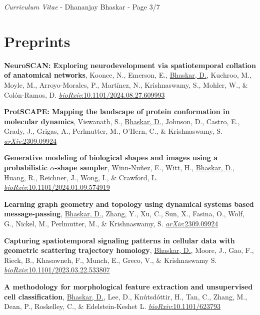 \documentclass[margin,line]{res}
\begin{document}
\begin{resume}
\newpage
\begin{flushright}
\textit{Curriculum Vitae} - Dhananjay Bhaskar - Page 3/7
\end{flushright}
\vspace*{.02cm}


\section{\sc Preprints}
{
\renewcommand\leftmargini{0em}
\renewcommand{\labelenumi}{P\theenumi}
\begin{etaremune}[start=6]
\item{\bf NeuroSCAN: Exploring neurodevelopment via spatiotemporal collation of anatomical networks},
Koonce, N., Emerson, E., \underline{Bhaskar, D.}, Kuchroo, M., Moyle, M., Arroyo-Morales, P., Martínez, N., Krishnaswamy, S., Mohler, W., \& Colón-Ramos, D.
\href{https://doi.org/10.1101/2024.08.27.609993}{\textit{bioRxiv}:10.1101/2024.08.27.609993}
\item{\bf ProtSCAPE: Mapping the landscape of protein conformation in molecular dynamics},
Viswanath, S., \underline{Bhaskar, D.}, Johnson, D., Castro, E., Grady, J., Grigas, A., Perlmutter, M., O'Hern, C., \& Krishnaswamy, S.
\href{https://arxiv.org/abs/2309.09924}{\textit{arXiv}:2309.09924}
\vspace*{.1cm}
\item{\bf Generative modeling of biological shapes and images using a probabilistic $\alpha$-shape sampler},
Winn-Nu\~{n}ez, E., Witt, H., \underline{Bhaskar, D.}, Huang, R., Reichner, J., Wong, I., \& Crawford, L.
\href{https://doi.org/10.1101/2024.01.09.574919}{\textit{bioRxiv}:10.1101/2024.01.09.574919}
\vspace*{.1cm}
\item{\bf Learning graph geometry and topology using dynamical systems based message-passing},
\underline{Bhaskar, D.}, Zhang, Y., Xu, C., Sun, X., Fasina, O., Wolf, G., Nickel, M., Perlmutter, M., \& Krishnaswamy, S. 
\href{https://arxiv.org/abs/2309.09924}{\textit{arXiv}:2309.09924}
\vspace*{.1cm}
\item{\bf Capturing spatiotemporal signaling patterns in cellular data with geometric scattering trajectory homology},
\underline{Bhaskar, D.}, Moore, J., Gao, F., Rieck, B., Khasawneh, F., Munch, E., Greco, V., \& Krishnaswamy S.
\href{https://doi.org/10.1101/2023.03.22.533807}{\textit{bioRxiv}:10.1101/2023.03.22.533807}
\vspace*{.1cm}
\item{\bf A methodology for morphological feature extraction and unsupervised cell classification},
\underline{Bhaskar, D.}, Lee, D., Kn\'{u}tsd\'{o}ttir, H., Tan, C., Zhang, M., Dean, P., Roskelley, C., \& Edelstein-Keshet L.
\href{https://www.biorxiv.org/content/10.1101/623793v1.abstract}{\textit{bioRxiv}:10.1101/623793}
\end{etaremune}
}


\end{resume}
\end{document}
